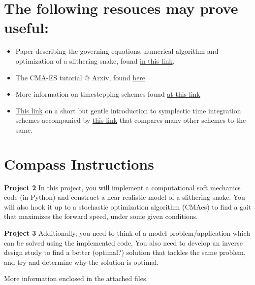 \documentclass[11pt]{article}
\begin{document}
\section{The following resouces may prove useful:}
\label{sec:references}
\begin{itemize}
\item Paper describing the governing equations, numerical algorithm and optimization
of a slithering snake, found \href{https://royalsocietypublishing.org/doi/full/10.1098/rsos.171628}{in this link}.
\item The CMA-ES tutorial @ Arxiv, found \href{https://arxiv.org/pdf/1604.00772.pdf}{here}
\item More information on timestepping schemes found \href{https://cg.informatik.uni-freiburg.de/course\_notes/sim\_02\_particles.pdf}{at this link}
\item \href{http://young.physics.ucsc.edu/115/leapfrog.pdf}{This link} on a short but gentle introduction to symplectic time integration
schemes accompanied by \href{http://www2.math.ethz.ch/education/bachelor/seminars/fs2008/nas/crivelli.pdf}{this link} that compares many other schemes to the same.
\end{itemize}
\section{Compass Instructions}
\label{sec:org0712f8a}
\textbf{Project 2}
In this project, you will implement a computational soft mechanics code (in Python) and construct a near-realistic model of a slithering snake. You will also hook it up to a stochastic optimization algorithm (CMAes) to find a gait that maximizes the forward speed, under some given conditions.

\noindent \textbf{Project 3}
Additionally, you need to think of a model problem/application which can be solved using the implemented code. You also need to develop an inverse design study to find a better (optimal?) solution that tackles the same problem, and try and determine why the solution is optimal.

More information enclosed in the attached files.
\end{document}
